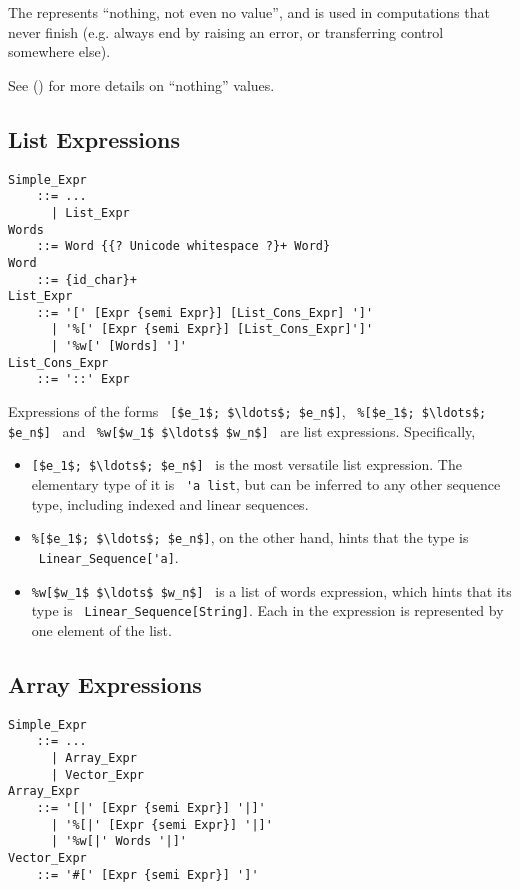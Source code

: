 The  represents ``nothing, not even no value'', and is used in computations that never finish (e.g. always end by raising an error, or transferring control somewhere else).

See () for more details on ``nothing'' values. 





\subsection{List Expressions}
\label{sec:list-expressions}

\grammar\begin{lstlisting}
Simple_Expr 
    ::= ...
      | List_Expr
Words
    ::= Word {{? Unicode whitespace ?}+ Word}
Word
    ::= {id_char}+
List_Expr
    ::= '[' [Expr {semi Expr}] [List_Cons_Expr] ']'
      | '%[' [Expr {semi Expr}] [List_Cons_Expr]']'
      | '%w[' [Words] ']'
List_Cons_Expr
    ::= '::' Expr
\end{lstlisting}

Expressions of the forms ~\lstinline![$e_1$; $\ldots$; $e_n$]!, ~\lstinline!%[$e_1$; $\ldots$; $e_n$]!~ and ~\lstinline!%w[$w_1$ $\ldots$ $w_n$]!~ are list expressions. Specifically, 
\begin{itemize}
  \item \lstinline![$e_1$; $\ldots$; $e_n$]!~ is the most versatile list expression. The elementary type of it is ~\lstinline!'a list!, but can be inferred to any other sequence type, including indexed and linear sequences. 
  \item \lstinline!%[$e_1$; $\ldots$; $e_n$]!, on the other hand, hints that the type is ~\lstinline!Linear_Sequence['a]!.
  \item \lstinline!%w[$w_1$ $\ldots$ $w_n$]!~ is a list of words expression, which hints that its type is ~\lstinline!Linear_Sequence[String]!. Each  in the expression is represented by one  element of the list. 
\end{itemize}






\subsection{Array Expressions}
\label{sec:array-expressions}

\grammar\begin{lstlisting}
Simple_Expr
    ::= ...
      | Array_Expr
      | Vector_Expr
Array_Expr
    ::= '[|' [Expr {semi Expr}] '|]'
      | '%[|' [Expr {semi Expr}] '|]'
      | '%w[|' Words '|]'
Vector_Expr
    ::= '#[' [Expr {semi Expr}] ']'
\end{lstlisting}

